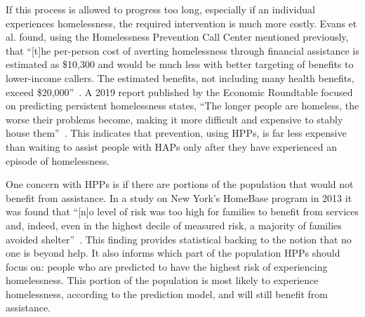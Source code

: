 \documentclass[10pt,letterpaper]{article}
\begin{document}
If this process is allowed to progress too long, especially if an individual experiences homelessness, the required intervention is much more costly. Evans et al. found, using the Homelessness Prevention Call Center mentioned previously, that ``[t]he per-person cost of averting homelessness through financial assistance is estimated as \$10,300 and would be much less with better targeting of benefits to lower-income callers. The estimated benefits, not including many health benefits, exceed \$20,000''~\cite{evans2016impact}. A 2019 report published by the Economic Roundtable focused on predicting persistent homelessness states, ``The longer people are homeless, the worse their problems become, making it more difficult and expensive to stably house them''~\cite{toros2019early}. This indicates that prevention, using HPPs, is far less expensive than waiting to assist people with HAPs only after they have experienced an episode of homelessness.

One concern with HPPs is if there are portions of the population that would not benefit from assistance. In a study on New York's HomeBase program in 2013 it was found that ``[n]o level of risk was too high for families to benefit from services and, indeed, even in the highest decile of measured risk, a majority of families avoided shelter''~\cite{shinn2013efficient}. This finding provides statistical backing to the notion that no one is beyond help. It also informs which part of the population HPPs should focus on: people who are predicted to have the highest risk of experiencing homelessness. This portion of the population is most likely to experience homelessness, according to the prediction model, and will still benefit from assistance.
\end{document}
